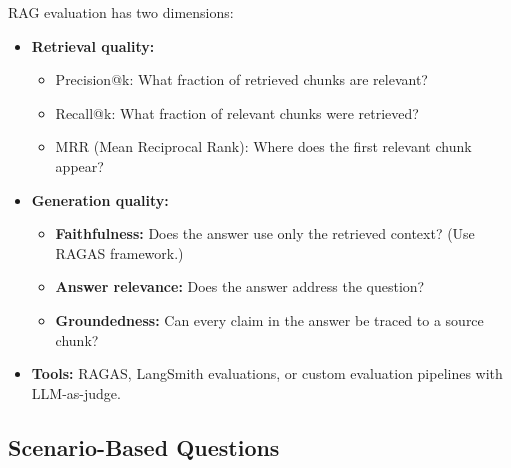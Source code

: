 \documentclass[12pt,a4paper]{article}
\begin{document}
\begin{interviewbox}
\end{interviewbox}
\begin{answerbox}
RAG evaluation has two dimensions:
\begin{itemize}
  \item \textbf{Retrieval quality:}
    \begin{itemize}
      \item Precision@k: What fraction of retrieved chunks are relevant?
      \item Recall@k: What fraction of relevant chunks were retrieved?
      \item MRR (Mean Reciprocal Rank): Where does the first relevant chunk appear?
    \end{itemize}
  \item \textbf{Generation quality:}
    \begin{itemize}
      \item \textbf{Faithfulness:} Does the answer use only the retrieved context? (Use RAGAS framework.)
      \item \textbf{Answer relevance:} Does the answer address the question?
      \item \textbf{Groundedness:} Can every claim in the answer be traced to a source chunk?
    \end{itemize}
  \item \textbf{Tools:} RAGAS, LangSmith evaluations, or custom evaluation pipelines with LLM-as-judge.
\end{itemize}
\end{answerbox}

\subsection{Scenario-Based Questions}
\end{document}
